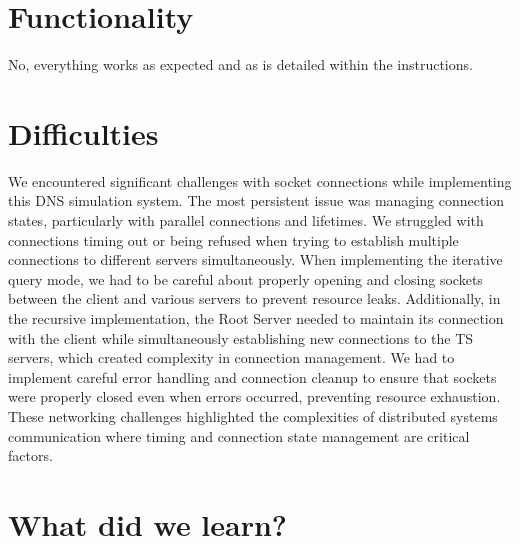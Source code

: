 \documentclass{article}
\begin{document}
\section{Functionality}

No, everything works as expected and as is detailed within the instructions.


\section{Difficulties}

We encountered significant challenges with socket connections while implementing this DNS simulation system. The most persistent issue was managing connection states, particularly with parallel connections and lifetimes. We struggled with connections timing out or being refused when trying to establish multiple connections to different servers simultaneously. When implementing the iterative query mode, we had to be careful about properly opening and closing sockets between the client and various servers to prevent resource leaks. Additionally, in the recursive implementation, the Root Server needed to maintain its connection with the client while simultaneously establishing new connections to the TS servers, which created complexity in connection management. We had to implement careful error handling and connection cleanup to ensure that sockets were properly closed even when errors occurred, preventing resource exhaustion. These networking challenges highlighted the complexities of distributed systems communication where timing and connection state management are critical factors.

\section{What did we learn?}
\end{document}
